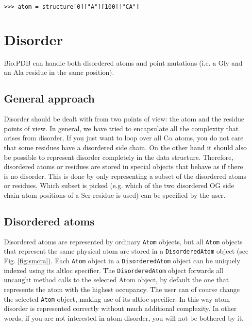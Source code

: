 \begin{verbatim}
>>> atom = structure[0]["A"][100]["CA"]
\end{verbatim}

\section{Disorder}

Bio.PDB can handle both disordered atoms and point mutations (i.e. a
Gly and an Ala residue in the same position).

\subsection{General approach}
\label{sec:disorder_problems}

Disorder should be dealt with from two points of view: the atom and the residue
points of view. In general, we have tried to encapsulate all the complexity that
arises from disorder. If you just want to loop over all C$\alpha$ atoms,
you do not care that some residues have a disordered side chain. On the other
hand it should also be possible to represent disorder completely in the data
structure. Therefore, disordered atoms or residues are stored in special objects
that behave as if there is no disorder. This is done by only representing a
subset of the disordered atoms or residues. Which subset is picked (e.g. which
of the two disordered OG side chain atom positions of a Ser residue is used)
can be specified by the user.

\subsection{Disordered atoms}
\label{sec:disordered_atoms}

Disordered atoms are represented by ordinary \texttt{Atom} objects, but
all \texttt{Atom} objects that represent the same physical atom are stored
in a \texttt{Disordered\-Atom} object (see Fig. \ref{fig:smcra}).
Each \texttt{Atom} object in a \texttt{Disordered\-Atom} object can
be uniquely indexed using its altloc specifier. The \texttt{Disordered\-Atom}
object forwards all uncaught method calls to the selected Atom object,
by default the one that represents the atom with the highest
occupancy. The user can of course change the selected \texttt{Atom}
object, making use of its altloc specifier. In this way atom disorder
is represented correctly without much additional complexity. In other
words, if you are not interested in atom disorder, you will not be
bothered by it.

